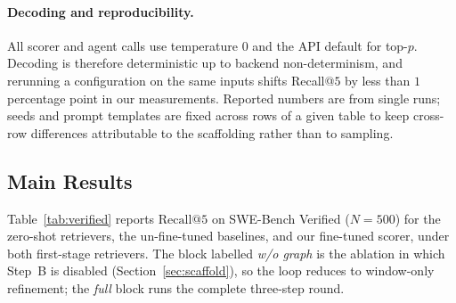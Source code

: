 \paragraph{Decoding and reproducibility.}
All scorer and agent calls use temperature $0$ and the API
default for top-$p$. Decoding is therefore deterministic up to
backend non-determinism, and rerunning a configuration on the
same inputs shifts Recall@$5$ by less than $1$ percentage point
in our measurements. Reported numbers are from single runs;
seeds and prompt templates are fixed across rows of a given
table to keep cross-row differences attributable to the
scaffolding rather than to sampling.

\subsection{Main Results}
\label{sec:main-results}

Table~\ref{tab:verified} reports $\text{Recall}@5$ on SWE-Bench
Verified ($N{=}500$) for the zero-shot retrievers, the
un-fine-tuned baselines, and our fine-tuned scorer, under both
first-stage retrievers. The block labelled \emph{w/o graph} is the
ablation in which Step~B is disabled (Section~\ref{sec:scaffold}),
so the loop reduces to window-only refinement; the \emph{full} block
runs the complete three-step round.

